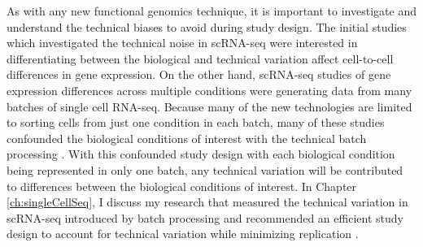 As with any new functional genomics technique, it is important to
investigate and understand the technical biases to avoid during study
design. The initial studies which investigated the technical noise in
scRNA-seq were interested in differentiating between the biological
and technical variation affect cell-to-cell differences in gene
expression. On the other hand, scRNA-seq studies of gene expression
differences across multiple conditions were generating data from many
batches of single cell RNA-seq. Because many of the new technologies
are limited to sorting cells from just one condition in each batch,
many of these studies confounded the biological conditions of interest
with the technical batch processing \citep{Hicks2015}. With this
confounded study design with each biological condition being
represented in only one batch, any technical variation will be
contributed to differences between the biological conditions of
interest. In Chapter \ref{ch:singleCellSeq}, I discuss my research
that measured the technical variation in scRNA-seq introduced by batch
processing and recommended an efficient study design to account for
technical variation while minimizing replication \citep{Tung2016}.
